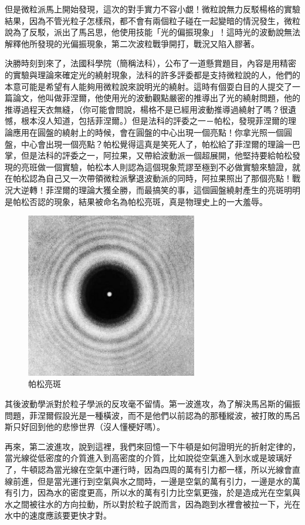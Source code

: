 但是微粒派馬上開始發現，這次的對手實力不容小覷！微粒說無力反駁楊格的實驗結果，因為不管光粒子怎樣飛，都不會有兩個粒子碰在一起變暗的情況發生，微粒說為了反駁，派出了馬呂思，他使用技能「光的偏振現象」！這時光的波動說無法解釋他所發現的光偏振現象，第二次波粒戰爭開打，戰況又陷入膠著。

決勝時刻到來了，法國科學院（簡稱法科），公布了一道懸賞題目，內容是用精密的實驗與理論來確定光的繞射現象，法科的許多評委都是支持微粒說的人，他們的本意可能是希望有人能夠用微粒說來說明光的繞射。這時有個耍白目的人提交了一篇論文，他叫做菲涅爾，他使用光的波動觀點嚴密的推導出了光的繞射問題，他的推導過程天衣無縫，（你可能會問說，楊格不是已經用波動推導過繞射了嗎？很遺憾，根本沒人知道，包括菲涅爾。）但是法科的評委之一－帕松，發現菲涅爾的理論應用在圓盤的繞射上的時候，會在圓盤的中心出現一個亮點！你拿光照一個圓盤，中心會出現一個亮點？帕松覺得這真是笑死人了，帕松給了菲涅爾的理論一巴掌，但是法科的評委之一，阿拉果，又帶給波動派一個超展開，他堅持要給帕松發現的亮班做一個實驗，帕松本人則認為這個現象荒謬至極到不必做實驗來驗證，就在帕松認為自己又一次帶領微粒派擊退波動派的同時，阿拉果照出了那個亮點！戰況大逆轉！菲涅爾的理論大獲全勝，而最搞笑的事，這個圓盤繞射產生的亮斑明明是帕松否認的現象，結果被命名為帕松亮斑，真是物理史上的一大羞辱。

\begin{figure}[H]
\centering
\graphicspath{{physics/}}
\includegraphics[width=7.5cm, center]{arago.png}
\caption{帕松亮斑}
\label{fig:mag}
\end{figure}

其後波動學派對於粒子學派的反攻毫不留情。第一波進攻，為了解決馬呂斯的偏振問題，菲涅爾假設光是一種橫波，而不是他們以前認為的那種縱波，被打敗的馬呂斯只好回到他的悲慘世界（沒人懂梗好嗎）。

再來，第二波進攻，說到這裡，我們來回憶一下牛頓是如何證明光的折射定律的，當光線從低密度的介質進入到高密度的介質，比如說從空氣進入到水或是玻璃好了，牛頓認為當光線在空氣中運行時，因為四周的萬有引力都一樣，所以光線會直線前進，但是當光運行到空氣與水之間時，一邊是空氣的萬有引力，一邊是水的萬有引力，因為水的密度更高，所以水的萬有引力比空氣更強，於是造成光在空氣與水之間被往水的方向拉動，所以對於粒子說而言，因為跑到水裡會被拉一下，光在水中的速度應該要更快才對。


